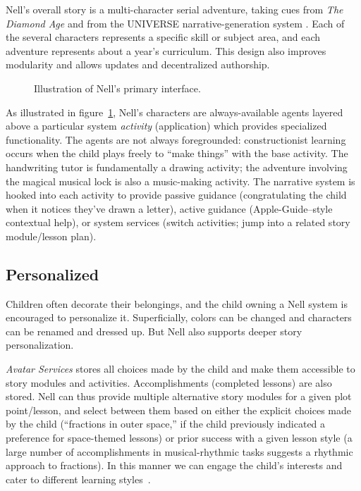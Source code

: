 \documentclass{acm_proc_article-sp}
\begin{document}
Nell's overall story is a multi-character serial adventure, taking
cues from \textit{The Diamond Age} and
from the UNIVERSE narrative-generation system \cite{lebowitz:universe84}.
Each of the several characters represents a specific skill or subject
area, and each adventure represents about a year's curriculum.  This
design also improves modularity and allows updates and decentralized
authorship.

\begin{figure}
\centering
{} %
\caption{Illustration of Nell's primary interface.}\label{fig:nell}
\end{figure}

As illustrated in figure~\ref{fig:nell}, Nell's characters are
always-available agents layered above a particular system \textit{activity}
(application) which provides specialized functionality.  The agents
are not always foregrounded: constructionist learning occurs when the
child plays freely to ``make things'' with the base activity.
The handwriting tutor is fundamentally a drawing activity; the
adventure involving the magical musical lock is also a music-making activity.
The narrative system is
hooked into each activity to provide passive guidance
(congratulating the child when it notices they've drawn a letter),
active guidance (Apple-Guide--style~\cite{powers:appleguide}
contextual help), or system services (switch activities; jump into a
related story module/lesson plan).


\subsection{Personalized}

Children often decorate their belongings, and the
child owning a Nell system is encouraged to personalize it.
Superficially, colors can be changed and characters can be renamed and
dressed up.  But Nell also supports deeper story personalization.

\textit{Avatar Services} stores all choices made by the child and make them
accessible to story modules and activities.  Accomplishments
(completed lessons) are also stored.  Nell can thus provide multiple
alternative story modules for a given plot point/lesson, and select
between them based on either the explicit choices made by the child
(``fractions in outer space,'' if the child previously indicated a
preference for space-themed lessons) or prior success with a given
lesson style (a large number of accomplishments in musical-rhythmic
tasks suggests a rhythmic approach to fractions).  In this manner we
can engage the child's interests and cater to different learning
styles~\cite{gardner:mi}.
\end{document}
